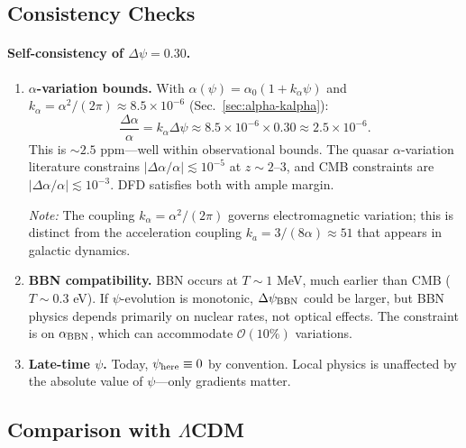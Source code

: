\subsection{Consistency Checks}\label{app:cmb-consistency}

\paragraph{Self-consistency of $\Delta\psi = 0.30$.}

\begin{enumerate}
\item \textbf{$\alpha$-variation bounds.}
With $\alpha(\psi) = \alpha_0(1 + k_\alpha\psi)$ and $k_\alpha = \alpha^2/(2\pi) \approx 8.5 \times 10^{-6}$ (Sec.~\ref{sec:alpha-kalpha}):
\begin{equation}
\frac{\Delta\alpha}{\alpha} = k_\alpha \Delta\psi \approx 8.5 \times 10^{-6} \times 0.30 \approx 2.5 \times 10^{-6}.
\end{equation}
This is $\sim 2.5$ ppm---well within observational bounds. The quasar $\alpha$-variation literature constrains $|\Delta\alpha/\alpha| \lesssim 10^{-5}$ at $z \sim 2$--$3$, and CMB constraints are $|\Delta\alpha/\alpha| \lesssim 10^{-3}$. DFD satisfies both with ample margin.

\textit{Note:} The coupling $k_\alpha = \alpha^2/(2\pi)$ governs electromagnetic variation; this is distinct from the acceleration coupling $k_a = 3/(8\alpha) \approx 51$ that appears in galactic dynamics.

\item \textbf{BBN compatibility.}
BBN occurs at $T \sim 1$ MeV, much earlier than CMB ($T \sim 0.3$ eV). If $\psi$-evolution is monotonic, $\Delta\psi_{\rm BBN}$ could be larger, but BBN physics depends primarily on nuclear rates, not optical effects. The constraint is on $\alpha_{\rm BBN}$, which can accommodate $\mathcal{O}(10\%)$ variations.

\item \textbf{Late-time $\psi$.}
Today, $\psi_{\rm here} \equiv 0$ by convention. Local physics is unaffected by the absolute value of $\psi$---only gradients matter.
\end{enumerate}

\subsection{Comparison with $\Lambda$CDM}\label{app:lcdm-comparison}

